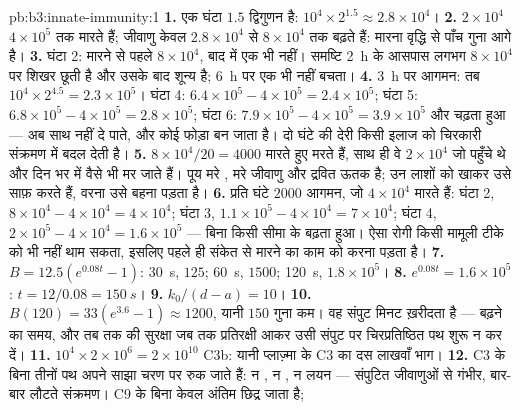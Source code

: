 \begin{solution}{pb:b3:innate-immunity:1}
\textbf{1.} एक घंटा $1.5$ द्विगुणन है: $10^{4}\times 2^{1.5} \approx
2.8\times 10^{4}$।
\textbf{2.} $2\times 10^{4}$  $4\times 10^{5}$ तक मारते हैं;
जीवाणु केवल $2.8\times 10^{4}$ से $8\times 10^{4}$ तक बढ़ते हैं:
मारना वृद्धि से पाँच गुना आगे है।
\textbf{3.} घंटा 2: मारने से पहले $8\times 10^{4}$, बाद में एक भी नहीं।
समष्टि \qty{2}{h} के आसपास लगभग $8\times 10^{4}$ पर शिखर छूती है और
उसके बाद शून्य है; \qty{6}{h} पर एक भी नहीं बचता।
\textbf{4.} \qty{3}{h} पर आगमन: तब $10^{4}\times 2^{4.5} = 2.3\times
10^{5}$। घंटा 4: $6.4\times 10^{5} - 4\times 10^{5} = 2.4\times
10^{5}$; घंटा 5: $6.8\times 10^{5} - 4\times 10^{5} = 2.8\times 10^{5}$;
घंटा 6: $7.9\times 10^{5} - 4\times 10^{5} = 3.9\times 10^{5}$ और
चढ़ता हुआ ---  अब साथ नहीं दे पाते, और कोई फोड़ा बन जाता है।
दो घंटे की देरी किसी इलाज को चिरकारी संक्रमण में बदल देती है।
\textbf{5.} $8\times 10^{4}/20 = 4000$  मारते हुए मरते हैं,
साथ ही वे $2\times 10^{4}$ जो पहुँचे थे और दिन भर में वैसे भी मर जाते
हैं। पूय मरे , मरे जीवाणु और द्रवित ऊतक है;  उन
लाशों को खाकर उसे साफ़ करते हैं, वरना उसे बहना पड़ता है।
\textbf{6.} प्रति घंटे $2000$ आगमन, जो $4\times 10^{4}$ मारते हैं:
घंटा 2, $8\times 10^{4} - 4\times 10^{4} = 4\times 10^{4}$; घंटा 3, $1.1\times
10^{5} - 4\times 10^{4} = 7\times 10^{4}$; घंटा 4, $2\times 10^{5} -
4\times 10^{4} = 1.6\times 10^{5}$ --- बिना किसी
सीमा के बढ़ता हुआ। ऐसा रोगी किसी मामूली टीके को भी नहीं थाम सकता,
इसलिए पहले ही संकेत से मारने का काम  को करना पड़ता है।
\textbf{7.} $B = 12.5(e^{0.08t} - 1)$: \qty{30}{s}, $125$; \qty{60}{s},
$1500$; \qty{120}{s}, $1.8\times 10^{5}$।
\textbf{8.} $e^{0.08t} = 1.6\times 10^{5}$: $t = 12/0.08 = \qty{150}{s}$।
\textbf{9.} $k_{0}/(d - a) = 10$।
\textbf{10.} $B(120) = 33(e^{3.6} - 1) \approx 1200$, यानी $150$ गुना कम।
वह संपुट मिनट ख़रीदता है --- बढ़ने का समय, और तब तक की सुरक्षा जब तक
प्रतिरक्षी आकर उसी संपुट पर चिरप्रतिष्ठित पथ शुरू न कर दें।
\textbf{11.} $10^{4}\times 2\times 10^{6} = 2\times 10^{10}$ C3b: यानी
प्लाज़्मा के C3 का दस लाखवाँ भाग।
\textbf{12.} C3 के बिना तीनों पथ अपने साझा चरण पर रुक जाते हैं: न
, न , न लयन --- संपुटित जीवाणुओं से गंभीर,
बार-बार लौटते संक्रमण। C9 के बिना केवल अंतिम छिद्र जाता है;

\end{solution}
